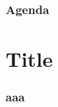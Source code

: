 \documentclass[11pt,notheorems]{beamer}
\begin{document}
\begin{frame}
\titlepage %
\end{frame}

\begin{frame}
\frametitle{Agenda}
\tableofcontents %
\end{frame}

\section{Title}
\begin{frame}
\frametitle{aaa}
\end{frame}
\end{document}
